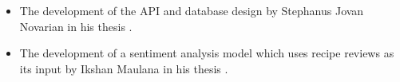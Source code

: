 \begin{itemize}
    \item The development of the API and database design by Stephanus Jovan Novarian in his thesis .
    \item The development of a sentiment analysis model which uses recipe reviews as its input by Ikshan Maulana in his thesis .
\end{itemize}


